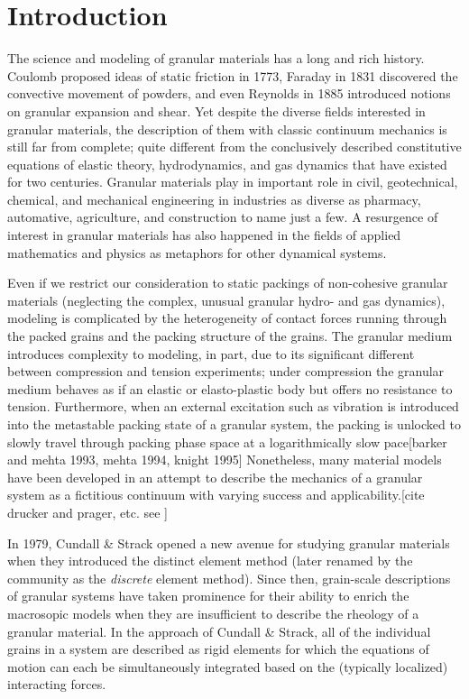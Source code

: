\chapter{Introduction} \label{sec:introduction}
The science and modeling of granular materials has a long and rich history. Coulomb proposed ideas of static friction in 1773, Faraday in 1831 discovered the convective movement of powders, and even Reynolds in 1885 introduced notions on granular expansion and shear.\cite{Jaeger1996a} Yet despite the diverse fields interested in granular materials, the description of them with classic continuum mechanics is still far from complete; quite different from the conclusively described constitutive equations of elastic theory, hydrodynamics, and gas dynamics that have existed for two centuries.\cite{Sadovskaya2012} Granular materials play in important role in civil, geotechnical, chemical, and mechanical engineering in industries as diverse as pharmacy, automative, agriculture, and construction to name just a few.\cite{Hill} A resurgence of interest in granular materials has also happened in the fields of applied mathematics and physics as metaphors for other dynamical systems.\cite{Jaeger1996a}

Even if we restrict our consideration to static packings of non-cohesive granular materials (neglecting the complex, unusual granular hydro- and gas dynamics), modeling is complicated by the heterogeneity of contact forces running through the packed grains and the packing structure of the grains.  The granular medium introduces complexity to modeling, in part, due to its significant different between compression and tension experiments; under compression the granular medium behaves as if an elastic or elasto-plastic body but offers no resistance to tension. Furthermore, when an external excitation such as vibration is introduced into the metastable packing state of a granular system, the packing is unlocked to slowly travel through packing phase space at a logarithmically slow pace[barker and mehta 1993, mehta 1994, knight 1995] Nonetheless, many material models have been developed in an attempt to describe the mechanics of a granular system as a fictitious continuum with varying success and applicability.[cite drucker and prager, etc. see \cite{Hill}]

In 1979, Cundall \& Strack opened a new avenue for studying granular materials when they introduced the distinct element method (later renamed by the community as the \textit{discrete} element method).\cite{Cundall1979} Since then, grain-scale descriptions of granular systems have taken prominence for their ability to enrich the macrosopic models when they are insufficient to describe the rheology of a granular material. In the approach of Cundall \& Strack, all of the individual grains in a system are described as rigid elements for which the equations of motion can each be simultaneously integrated based on the (typically localized) interacting forces.

